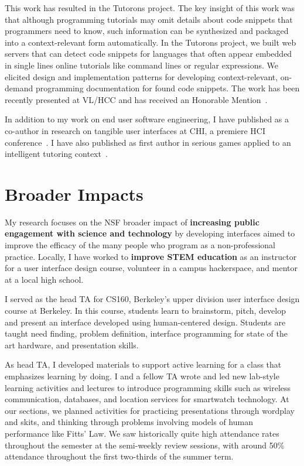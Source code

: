 \documentclass[12pt]{memoir}
\begin{document}
This work has resulted in the Tutorons project.
The key insight of this work was that although programming tutorials may omit details about code snippets that programmers need to know, such information can be synthesized and packaged into a context-relevant form automatically.
In the Tutorons project, we built web servers that can detect code snippets for languages that often appear embedded in single lines online tutorials like command lines or regular expressions.
We elicited design and implementation patterns for developing context-relevant, on-demand programming documentation for found code snippets.
The work has been recently presented at VL/HCC and has received an Honorable Mention~\cite{head_tutorons_2015}.

In addition to my work on end user software engineering, I have published as a co-author in research on tangible user interfaces at CHI, a premiere HCI conference~\cite{savage_lamello_2015}.
I have also published as first author in serious games applied to an intelligent tutoring context~\cite{head_tonewars_2014}.

\section{Broader Impacts}

My research focuses on the NSF broader impact of \textbf{increasing public engagement with science and technology} by developing interfaces aimed to improve the efficacy of the many people who program as a non-professional practice.
Locally, I have worked to \textbf{improve STEM education} as an instructor for a user interface design course, volunteer in a campus hackerspace, and mentor at a local high school.

I served as the head TA for CS160, Berkeley's upper division user interface design course at Berkeley.
In this course, students learn to brainstorm, pitch, develop and present an interface developed using human-centered design.
Students are taught need finding, problem definition, interface programming for state of the art hardware, and presentation skills.

As head TA, I developed materials to support active learning for a class that emphasizes learning by doing.
I and a fellow TA wrote and led new lab-style learning activities and lectures to introduce programming skills such as wireless communication, databases, and location services for smartwatch technology.
At our sections, we planned activities for practicing presentations through wordplay and skits, and thinking through problems involving models of human performance like Fitts' Law.
We saw historically quite high attendance rates throughout the semester at the semi-weekly review sessions, with around 50\% attendance throughout the first two-thirds of the summer term.
\end{document}

